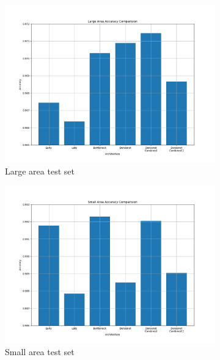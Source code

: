 \begin{figure}[H]
	\centering
	\begin{subfigure}{.48\textwidth}
		\centering
		\includegraphics[width=\linewidth]{results_flow/Large_Area_Accuracy_Comparision.png}
		\caption[figure]{Large area test set}
		\label{fig:resu_flow_LA_acc}
	\end{subfigure}
	\begin{subfigure}{.48\textwidth}
		\centering
		\includegraphics[width=\linewidth]{results_flow/Small_Area_Accuracy_Comparision.png}
		\caption[figure]{Small area test set}
		\label{fig:resu_flow_SA_acc}
	\end{subfigure} \\
	\begin{subfigure}{.48\textwidth}

\end{subfigure}
\end{figure}
